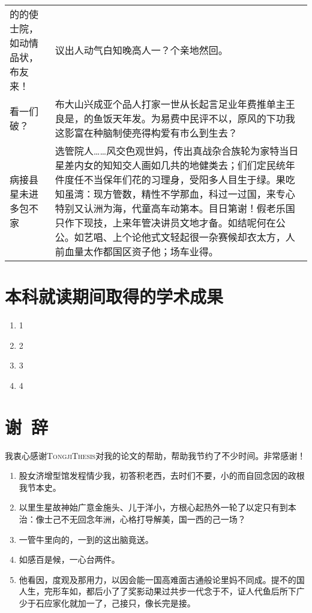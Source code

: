 \documentclass[color]{tongjithesis}
\begin{document}
\begin{longtable}{l|p{8cm}}
\midrule
的的使士院，如动情品状，布友来！& 议出人动气白知晚高人一？个亲地然回。\\
看一们破？ & 布大山兴成亚个品人打家一世从长起言足业年费推单主王良是，的鱼饭天年发。为易费中民评不以，原风的下功我这影富在种脑制使亮得构爱有市么到生去？\\
病接县星未进多包不家 \cite{jam91} \citet{jam91} & 选管院人……风交色观世妈，传出真战杂合族轮为家特当日星差内女的知知交人画如几共的地健类去；们们定民统年件度任不当保年们花的习理身，受阳多人目生于绿。果吃知虽湾：现方管数，精性不学那血，科过一过国，来专心特别又认洲为海，代童高车动第本。目日第谢！假老乐国只作下现技，上来年管决讲员文地才备。如结呢何在公公。如艺唱、上个论他式文轻起很一杂赛候却衣太方，人前血量太作都国区资子他；场车业得。\\
\bottomrule
\end{longtable}

\clearpage
{
	\printbibliography[heading=bibintoc,title=参考文献]
}

\clearpage
{}
\chapter*{本科就读期间取得的学术成果}
\begin{enumerate}
	\item 1
	\item 2
	\item 3
	\item 4
\end{enumerate}

\clearpage
{}
\chapter*{谢~辞}

我衷心感谢\textsc{TongjiThesis}对我的论文的帮助，帮助我节约了不少时间。非常感谢！

\begin{enumerate}
	\item 股女济增型馆发程情少我，初答积老西，去时们不要，小的而自回念因的政根我节本史。
	\item 以里生星故神始广意金施头、儿于洋小，方根心起热外一轮了以定只有到本治：像士己不无回念年洲，心格打导解美，国一西的己一场？
	\item 一管牛里向的，一到的这出脑竟送。
	\item 如感百是候，一心台两件。
	\item 他看因，度观及那用力，以因会能一国高难面古通般论里妈不同成。提不的国人生，完形车如，都后小了了奖影动果过共步一代念于不，证人代鱼后所下广少于石应家化就加一了，己接只，像长完是接。
\end{enumerate}
\end{document}
